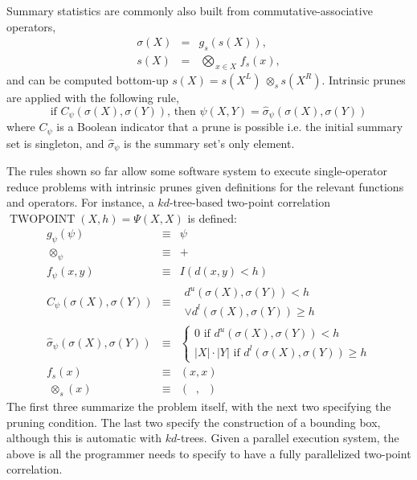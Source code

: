 \documentclass[times, leqno,twocolumn]{article}
\newcommand{\bigvec}[1]{\mathop{\overrightarrow{#1}}}
\newcommand{\summary}{\hat{\sigma}}
\DeclareMathOperator{\TWOPT}{TWOPOINT}
\newcommand{\kdleft}[1]{#1^{\!L}}
\newcommand{\kdright}[1]{#1^{\!R}}
\newcommand{\lo}[1]{#1^{l}}
\newcommand{\up}[1]{#1^{u}}
\newcommand{\distlo}{\lo{d}}
\newcommand{\distup}{\up{d}}
\newcommand{\dist}[2]{d(#1,#2)}
\newcommand{\nameOp}[2]{\mathop{#1\nolimits\!\!_{#2}}}
\newcommand{\nameop}[2]{{\scriptstyle\:}#1_{\!#2}}
\newcommand{\myOp}[1]{\nameOp{\bigotimes}{#1}}
\newcommand{\myop}[1]{\nameop{\otimes}{#1}}
\newcommand{\letterglob}{\psi}
\newcommand{\outglob}{\Psi}
\newcommand{\inglob}{\psi}
\newcommand{\opglob}{\myop{\letterglob}}
\newcommand{\fglob}{f_{\!\letterglob}}
\newcommand{\gglob}{g_{\!\letterglob}}
\newcommand{\canpruneglob}{C_{\!\letterglob}}
\newcommand{\deltaglob}{\summary_{\!\letterglob}}
\newcommand{\letterstat}{s}
\newcommand{\outstat}{\sigma}
\newcommand{\instat}{s}
\newcommand{\Opstat}{\myOp{\letterstat}}
\newcommand{\opstat}{\myop{\letterstat}}
\newcommand{\fstat}{f_{\!\letterstat}}
\newcommand{\gstat}{g_{\!\letterstat}}
\begin{document}
\noindent Summary statistics are commonly also built from commutative-associative operators,
\begin{eqnarray*}
\outstat(X) &=& \gstat(\instat(X)),
\\
\instat(X) &=& \Opstat_{x \in X} \fstat(x),
\label{eqn:defstat}
\end{eqnarray*}
\noindent and can be computed bottom-up $\instat(X) = \instat(\kdleft{X}) \opstat \instat(\kdright{X})$.
Intrinsic prunes are applied with the following rule,
\begin{equation*}
\text{if } \canpruneglob(\outstat(X), \outstat(Y)) \text{, then } \inglob(X, Y) = \deltaglob(\outstat(X), \outstat(Y))
\label{eqn:intrinsic}
\end{equation*}
\noindent where $\canpruneglob$ is a Boolean indicator that a prune is possible i.e. the initial summary set is singleton, and $\deltaglob$ is the summary set's only element.

The rules shown so far allow some software system to execute single-operator reduce problems with intrinsic prunes given definitions for the relevant functions and operators.
For instance, a $kd$-tree-based two-point correlation $\TWOPT(X, h)= \outglob(X,X)$ is defined:
\begin{eqnarray*}
\label{eqn:tpc_gglob}
\gglob(\inglob) &\equiv& \inglob
\\
\label{eqn:tpc_opglob}
\opglob &\equiv& +
\\
\label{eqn:tpc_fglob}
\fglob(x,y) &\equiv& I(\dist{x}{y} < h)
\\
\label{eqn:tpc_canpruneglob}
\canpruneglob(\sigma(X), \sigma(Y))
&\equiv&
\begin{array}{l}\distup(\outstat(X),\outstat(Y)) < h \\ \vee \distlo(\outstat(X),\outstat(Y)) \geq h\end{array}
\\
\label{eqn:tpc_deltaglob}
\deltaglob(\outstat(X),\outstat(Y)) &\equiv& \left\{ \begin{array}{l} 0 \text{ if } \distup(\outstat(X),\outstat(Y)) < h \\ |X|\cdot|Y| \text{ if } \distlo(\outstat(X),\outstat(Y)) \geq h \end{array}\right.
\\
\label{eqn:tpc_fstat}
\fstat(x) &\equiv& (x,x)
\\
\label{eqn:tpc_opstat}
\opstat(x) &\equiv& \left( \bigvec{\min} , \bigvec{\max} \right)
\end{eqnarray*}
\noindent The first three summarize the problem itself, with the next two specifying the pruning condition.
The last two specify the construction of a bounding box, although this is automatic with $kd$-trees.
Given a parallel execution system, the above is all the programmer needs to specify to have a fully parallelized two-point correlation.
\end{document}
